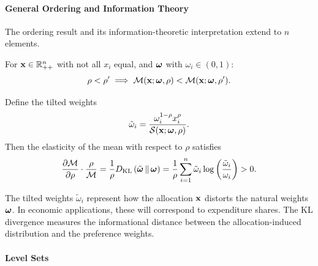 \paragraph{General Ordering and Information Theory}

The ordering result and its information-theoretic interpretation extend to $n$ elements.

\begin{proposition}
\label{prop:general-ordering}
For $\mathbf{x} \in \mathbb{R}_{++}^n$ with not all $x_i$ equal, and $\boldsymbol{\omega}$ with $\omega_i \in (0,1)$:
\begin{equation}
\rho < \rho' \implies \mathcal{M}(\mathbf{x}; \boldsymbol{\omega}, \rho) < \mathcal{M}(\mathbf{x}; \boldsymbol{\omega}, \rho').
\end{equation}
\end{proposition}

\begin{proposition}
\label{prop:general-kl}
Define the tilted weights
\begin{equation}
\tilde{\omega}_i = \frac{\omega_i^{1-\rho} x_i^\rho}{\mathcal{S}(\mathbf{x}; \boldsymbol{\omega}, \rho)}.
\end{equation}
Then the elasticity of the mean with respect to $\rho$ satisfies
\begin{equation}
\frac{\partial \mathcal{M}}{\partial \rho} \cdot \frac{\rho}{\mathcal{M}} = \frac{1}{\rho} D_{\mathrm{KL}}\left(\tilde{\boldsymbol{\omega}} \,\|\, \boldsymbol{\omega}\right) = \frac{1}{\rho} \sum_{i=1}^n \tilde{\omega}_i \log\left( \frac{\tilde{\omega}_i}{\omega_i} \right) > 0.
\end{equation}
\end{proposition}

\begin{calloutnote}[Interpretation]
The tilted weights $\tilde{\omega}_i$ represent how the allocation $\mathbf{x}$ distorts the natural weights $\boldsymbol{\omega}$. In economic applications, these will correspond to expenditure shares. The KL divergence measures the informational distance between the allocation-induced distribution and the preference weights.
\end{calloutnote}

\paragraph{Level Sets}

